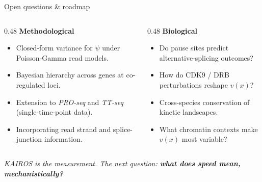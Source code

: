 \documentclass[aspectratio=169,11pt]{beamer}
\newcommand{\goldbf}[1]{{\color{KGold}\bfseries #1}}
\newcommand{\skyit}[1]{{\color{KSky}\itshape #1}}
\begin{document}
\begin{frame}{Open questions \& roadmap}
\begin{columns}[T,onlytextwidth]
\begin{column}{0.48\textwidth}
  \vspace{0.3em}
  {\color{KGold}\bfseries Methodological}
  \begin{itemize}
    \setlength{\itemsep}{0.25em}
    \item Closed-form variance for $\psi$ under Poisson-Gamma read models.
    \item Bayesian hierarchy across genes at co-regulated loci.
    \item Extension to \skyit{PRO-seq} and \skyit{TT-seq} (single-time-point data).
    \item Incorporating read strand and splice-junction information.
  \end{itemize}
\end{column}
\begin{column}{0.48\textwidth}
  \vspace{0.3em}
  {\color{KGold}\bfseries Biological}
  \begin{itemize}
    \setlength{\itemsep}{0.25em}
    \item Do pause sites predict alternative-splicing outcomes?
    \item How do CDK9 / DRB perturbations reshape $v(x)$?
    \item Cross-species conservation of kinetic landscapes.
    \item What chromatin contexts make $v(x)$ most variable?
  \end{itemize}
\end{column}
\end{columns}
\vspace{1em}
\begin{center}
  {\color{KCream}\itshape KAIROS is the measurement. The next question: \goldbf{what does speed mean, mechanistically?}}
\end{center}
\end{frame}
\end{document}
